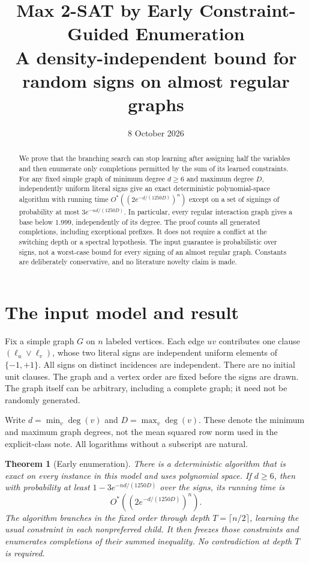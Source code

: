 \documentclass[11pt,a4paper]{article}
\title{Max 2-SAT by Early Constraint-Guided Enumeration\\
\large A density-independent bound for random signs on almost regular graphs}
\author{}
\date{8 October 2026}
\newtheorem{theorem}{Theorem}
\theoremstyle{remark}
\newcommand{\Ostar}{O^{*}}
\begin{document}
\maketitle

\begin{abstract}
We prove that the branching search can stop learning after assigning half
the variables and then enumerate only completions permitted by the sum of
its learned constraints. For any fixed simple graph of minimum degree
$d\ge6$ and maximum degree $D$, independently uniform literal signs give
an exact deterministic polynomial-space algorithm with running time
$\Ostar((2e^{-d/(1250D)})^n)$ except on a set of signings of probability
at most $3e^{-nd/(1250D)}$. In particular, every regular interaction graph
gives a base below $1.999$, independently of its degree. The proof counts
all generated completions, including exceptional prefixes. It does not
require a conflict at the switching depth or a spectral hypothesis.
The input guarantee is probabilistic over signs, not a worst-case bound
for every signing of an almost regular graph. Constants are deliberately
conservative, and no literature novelty claim is made.
\end{abstract}

\section{The input model and result}

Fix a simple graph $G$ on $n$ labeled vertices. Each edge $uv$ contributes
one clause $(\ell_u\vee\ell_v)$, whose two literal signs are independent
uniform elements of $\{-1,+1\}$. All signs on distinct incidences are
independent. There are no initial unit clauses. The graph and a vertex
order are fixed before the signs are drawn. The graph itself can be
arbitrary, including a complete graph; it need not be randomly generated.

Write $d=\min_v\deg(v)$ and $D=\max_v\deg(v)$. These denote the minimum
and maximum graph degrees, not the mean squared row norm used in the
explicit-class note. All logarithms without a subscript are natural.

\begin{theorem}[Early enumeration]\label{thm:main}
There is a deterministic algorithm that is exact on every instance in
this model and uses polynomial space. If $d\ge6$, then with probability
at least $1-3e^{-nd/(1250D)}$ over the signs, its running time is
\[
 \Ostar\left((2e^{-d/(1250D)})^n\right).
\]
The algorithm branches in the fixed order through depth
$T=\lceil n/2\rceil$, learning the usual constraint in each nonpreferred
child. It then freezes those constraints and enumerates completions of
their summed inequality. No contradiction at depth $T$ is required.
\end{theorem}
\end{document}
